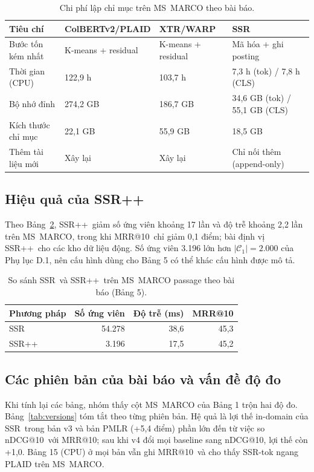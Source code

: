 \documentclass[a4paper,13pt]{extreport}
\makeatletter
\theoremstyle{plain}
\newcommand{\ssr}{SSR}
\newcommand{\ssrpp}{SSR++}
\newcommand{\ndcg}{nDCG@10}
\newcommand{\mrr}{MRR@10}
\makeatother
\begin{document}
\begin{table}[htbp]
\centering
\caption{Chi phí lập chỉ mục trên MS~MARCO theo bài báo.}
\label{tab:index-cost}
\small
\begin{tabular}{p{3.6cm}p{2.9cm}p{2.9cm}p{3.6cm}}
\toprule
\textbf{Tiêu chí} & \textbf{ColBERTv2/PLAID} & \textbf{XTR/WARP} & \textbf{\ssr}\\
\midrule
Bước tốn kém nhất & K-means + residual & K-means + residual & Mã hóa + ghi posting\\
Thời gian (CPU) & 122,9 h & 103,7 h & 7,3 h (tok) / 7,8 h (CLS)\\
Bộ nhớ đỉnh & 274,2 GB & 186,7 GB & 34,6 GB (tok) / 55,1 GB (CLS)\\
Kích thước chỉ mục & 22,1 GB & 55,9 GB & 18,5 GB\\
Thêm tài liệu mới & Xây lại & Xây lại & Chỉ nối thêm (append-only)\\
\bottomrule
\end{tabular}
\end{table}

\subsection{Hiệu quả của \ssrpp}
Theo Bảng~\ref{tab:ssrpp-paper}, \ssrpp\ giảm số ứng viên khoảng 17 lần và độ trễ khoảng 2,2 lần trên MS~MARCO, trong khi \mrr\ chỉ giảm 0,1 điểm; bài định vị \ssrpp\ cho các kho dữ liệu động. Số ứng viên 3.196 lớn hơn $|\mathcal{C}_1|=2.000$ của Phụ lục D.1, nên cấu hình dùng cho Bảng 5 có thể khác cấu hình được mô tả.

\begin{table}[htbp]
\centering
\caption{So sánh \ssr\ và \ssrpp\ trên MS~MARCO passage theo bài báo (Bảng 5).}
\label{tab:ssrpp-paper}
\small
\begin{tabular}{lrrr}
\toprule
\textbf{Phương pháp} & \textbf{Số ứng viên} & \textbf{Độ trễ (ms)} & \textbf{\mrr}\\
\midrule
\ssr & 54.278 & 38,6 & 45,3\\
\ssrpp & 3.196 & 17,5 & 45,2\\
\bottomrule
\end{tabular}
\end{table}

\subsection{Các phiên bản của bài báo và vấn đề độ đo}
\label{sec:versions}
Khi tính lại các bảng, nhóm thấy cột MS~MARCO của Bảng 1 trộn hai độ đo. Bảng~\ref{tab:versions} tóm tắt theo từng phiên bản. Hệ quả là lợi thế in-domain của \ssr\ trong bản v3 và bản PMLR (+5,4 điểm) phần lớn đến từ việc so \ndcg\ với \mrr; sau khi v4 đổi mọi baseline sang \ndcg, lợi thế còn +1,0. Bảng 15 (CPU) ở mọi bản vẫn ghi \mrr\ và cho thấy \ssr-tok ngang PLAID trên MS~MARCO.
\end{document}

